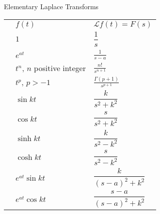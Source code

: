 \documentclass[10pt,letterpaper]{article}
\begin{document}
\pagestyle{empty}

\begin{center}
\begin{large}
Elementary Laplace Transforms
\end{large}
\end{center}

\newcommand{\LTNUM}{\stepcounter{NumberInTable}{(\theNumberInTable)}}

\vspace{-2ex}
    \renewcommand{\arraystretch}{2.5}
    \begin{center}
    \begin{tabular}{ p{1cm} p{5cm} p{4.8cm} }
        & $f(t)$ & $\mathcal L{f(t)}=F(s)$ \\ 
        \LTNUM & $1$ & $\displaystyle \dfrac{1}{s}$  \\ 
        \LTNUM & $e^{at}$	& $\displaystyle \frac{1}{s-a}$ \\ 
        \LTNUM & $t^n$, $n$ positive integer	& $\displaystyle \frac{n!}{s^{n+1}}$  \\ 
        \LTNUM & $t^p$, $p > -1$	& $\displaystyle \frac{\Gamma(p+1)}{s^{p+1}}$  \\ 
        \LTNUM &$\sin kt$ 	& $\displaystyle \dfrac{k}{s^2+k^2}$ \\ 
        \LTNUM &$\cos kt$ 	& $\displaystyle \dfrac{s}{s^2+k^2}$ \\ 
        \LTNUM &$\sinh kt$	& $\displaystyle \dfrac{k}{s^2-k^2}$ \\ 
        \LTNUM &$\cosh kt$	& $\displaystyle \dfrac{s}{s^2-k^2}$ \\ 
        \LTNUM &$e^{at}\sin kt$	& $\displaystyle \dfrac{k}{(s-a)^2+k^2}$   \\ 
        \LTNUM &$e^{at}\cos kt$	& $\displaystyle \dfrac{s-a}{(s-a)^2+k^2}$  \\ 
    \end{tabular}
\end{center}
\end{document}
